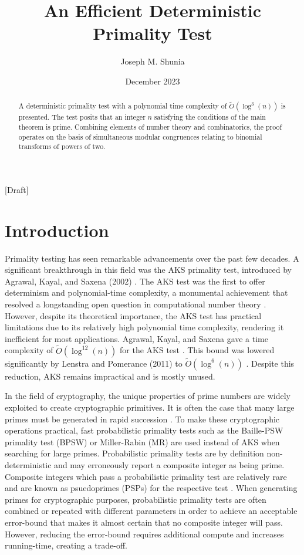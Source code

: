 \documentclass{article}
\title{An Efficient Deterministic Primality Test}
\author{Joseph M. Shunia}
\date{December 2023}
\theoremstyle{plain}
\theoremstyle{definition}
\begin{document}
\maketitle
\begin{center}
    [Draft]
\end{center}

\begin{abstract}
A deterministic primality test with a polynomial time complexity of $\tilde{O}(\log^3(n))$ is presented. The test posits that an integer $n$ satisfying the conditions of the main theorem is prime. Combining elements of number theory and combinatorics, the proof operates on the basis of simultaneous modular congruences relating to binomial transforms of powers of two.
\end{abstract}

\section{Introduction}

Primality testing has seen remarkable advancements over the past few decades. A significant breakthrough in this field was the AKS primality test, introduced by Agrawal, Kayal, and Saxena (2002) \cite{aks2002}. The AKS test was the first to offer determinism and polynomial-time complexity, a monumental achievement that resolved a longstanding open question in computational number theory \cite{goldreich2008}. However, despite its theoretical importance, the AKS test has practical limitations due to its relatively high polynomial time complexity, rendering it inefficient for most applications. Agrawal, Kayal, and Saxena gave a time complexity of $\tilde{O}(\log^{12}(n))$ for the AKS test \cite{aks2002}. This bound was lowered significantly by Lenstra and Pomerance (2011) to $\tilde{O}(\log^6(n))$ \cite{lenstra2011}. Despite this reduction, AKS remains impractical and is mostly unused.

In the field of cryptography, the unique properties of prime numbers are widely exploited to create cryptographic primitives. It is often the case that many large primes must be generated in rapid succession \cite{lenstra1987}. To make these cryptographic operations practical, fast probabilistic primality tests such as the Baille-PSW primality test (BPSW) \cite{baillie1980} or Miller-Rabin (MR) \cite{rabin1980} \cite{miller1976} are used instead of AKS when searching for large primes. Probabilistic primality tests are by definition non-deterministic and may erroneously report a composite integer as being prime. Composite integers which pass a probabilistic primality test are relatively rare and are known as psuedoprimes (PSPs) for the respective test \cite{wagstaff1983}. When generating primes for cryptographic purposes, probabilistic primality tests are often combined or repeated with different parameters in order to achieve an acceptable error-bound that makes it almost certain that no composite integer will pass. However, reducing the error-bound requires additional compute and increases running-time, creating a trade-off.
\end{document}
